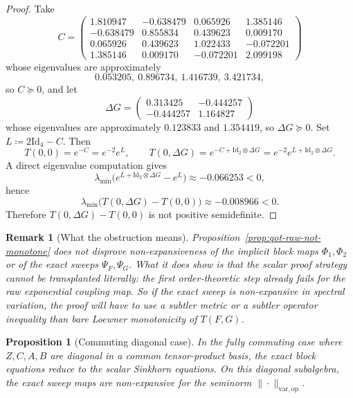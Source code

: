 \documentclass[11pt]{article}
\newcommand{\Id}{\mathrm{Id}}
\newcommand{\eqdef}{\coloneqq}
\newcommand{\op}{\mathrm{op}}
\newcommand{\varop}{\mathrm{var},\op}
\theoremstyle{plain}
\newtheorem{proposition}{Proposition}[section]
\newtheorem{remark}{Remark}[section]
\begin{document}
\begin{proof}
Take
\[
C=
\begin{pmatrix}
 1.810947 & -0.638479 &  0.065926 &  1.385146 \\
-0.638479 &  0.855834 &  0.439623 &  0.009170 \\
 0.065926 &  0.439623 &  1.022433 & -0.072201 \\
 1.385146 &  0.009170 & -0.072201 &  2.099198
\end{pmatrix}
\]
whose eigenvalues are approximately
\[
0.053205,\ 0.896734,\ 1.416739,\ 3.421734,
\]
so $C \succeq 0$, and let
\[
\Delta G=
\begin{pmatrix}
 0.313425 & -0.444257 \\
-0.444257 &  1.164827
\end{pmatrix}
\]
whose eigenvalues are approximately $0.123833$ and $1.354419$, so $\Delta G \succeq 0$.
Set $L \eqdef 2\Id_4-C$. Then
\[
T(0,0)=e^{-C}=e^{-2}e^L,
\qquad
T(0,\Delta G)=e^{-C+\Id_2\otimes \Delta G}=e^{-2}e^{L+\Id_2\otimes \Delta G}.
\]
A direct eigenvalue computation gives
\[
\lambda_{\min}\!\bigl(e^{L+\Id_2\otimes \Delta G}-e^L\bigr)\approx -0.066253<0,
\]
hence
\[
\lambda_{\min}\!\bigl(T(0,\Delta G)-T(0,0)\bigr)\approx -0.008966<0.
\]
Therefore $T(0,\Delta G)-T(0,0)$ is not positive semidefinite.
\end{proof}

\begin{remark}[What the obstruction means]
\label{rem:qot-raw-monotone-obstacle}
Proposition~\ref{prop:qot-raw-not-monotone} does \emph{not} disprove non-expansiveness of the implicit block maps $\Phi_1,\Phi_2$ or of the exact sweeps $\Psi_F,\Psi_G$.
What it does show is that the scalar proof strategy cannot be transplanted literally: the first order-theoretic step already fails for the raw exponential coupling map.
So if the exact sweep is non-expansive in spectral variation, the proof will have to use a subtler metric or a subtler operator inequality than bare Loewner monotonicity of $T(F,G)$.
\end{remark}

\begin{proposition}[Commuting diagonal case]
\label{prop:qot-commuting-contract}
In the fully commuting case where $Z,C,A,B$ are diagonal in a common tensor-product basis, the exact block equations reduce to the scalar Sinkhorn equations.
On this diagonal subalgebra, the exact sweep maps are non-expansive for the seminorm $\|\cdot\|_{\varop}$.
\end{proposition}
\end{document}
